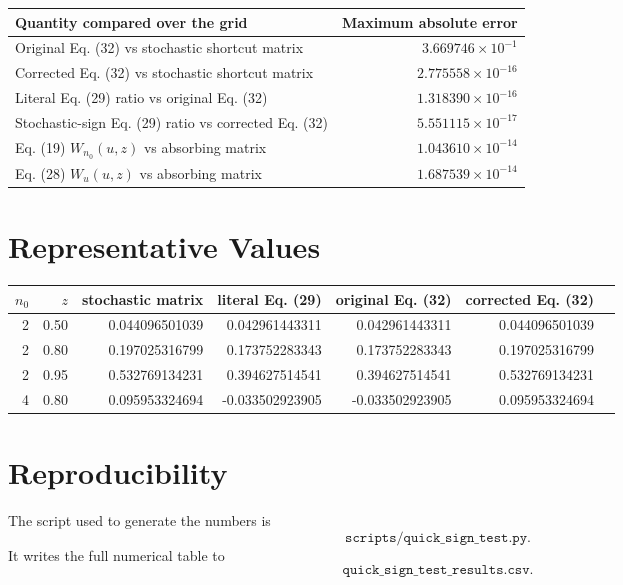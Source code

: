 \documentclass[11pt]{article}
\begin{document}
\begin{center}
\begin{tabularx}{0.98\linewidth}{@{}Xr@{}}
\toprule
Quantity compared over the grid & Maximum absolute error \\
\midrule
Original Eq. (32) vs stochastic shortcut matrix & \(3.669746\times10^{-1}\) \\
Corrected Eq. (32) vs stochastic shortcut matrix & \(2.775558\times10^{-16}\) \\
Literal Eq. (29) ratio vs original Eq. (32) & \(1.318390\times10^{-16}\) \\
Stochastic-sign Eq. (29) ratio vs corrected Eq. (32) & \(5.551115\times10^{-17}\) \\
Eq. (19) \(W_{n_0}(u,z)\) vs absorbing matrix & \(1.043610\times10^{-14}\) \\
Eq. (28) \(W_u(u,z)\) vs absorbing matrix & \(1.687539\times10^{-14}\) \\
\bottomrule
\end{tabularx}
\end{center}

\section*{Representative Values}

\begin{center}
\small
\begin{tabular}{@{}rrrrrrr@{}}
\toprule
\(n_0\) & \(z\) & stochastic matrix & literal Eq. (29) & original Eq. (32) & corrected Eq. (32) \\
\midrule
2 & 0.50 & 0.044096501039 & 0.042961443311 & 0.042961443311 & 0.044096501039 \\
2 & 0.80 & 0.197025316799 & 0.173752283343 & 0.173752283343 & 0.197025316799 \\
2 & 0.95 & 0.532769134231 & 0.394627514541 & 0.394627514541 & 0.532769134231 \\
4 & 0.80 & 0.095953324694 & -0.033502923905 & -0.033502923905 & 0.095953324694 \\
\bottomrule
\end{tabular}
\end{center}

\section*{Reproducibility}

The script used to generate the numbers is
\[
\texttt{scripts/quick\_sign\_test.py}.
\]
It writes the full numerical table to
\[
\texttt{quick\_sign\_test\_results.csv}.
\]
\end{document}
